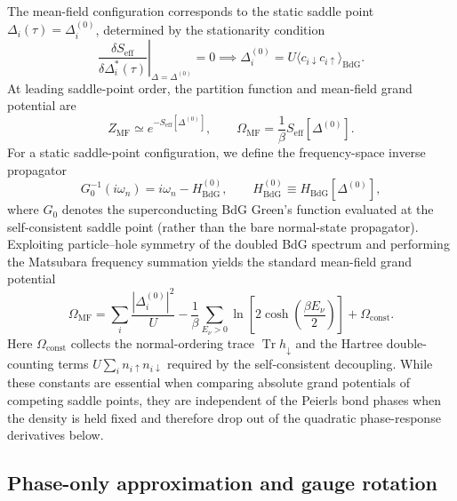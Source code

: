 \documentclass[aps,prb,twocolumn,superscriptaddress,floatfix]{revtex4-2}
\newcommand{\Tr}{\operatorname{Tr}}
\begin{document}
The mean-field configuration corresponds to the static saddle point $\Delta_i(\tau) = \Delta_i^{(0)}$, determined by the stationarity condition
\begin{equation}
\left.\frac{\delta S_{\mathrm{eff}}}{\delta \Delta_i^*(\tau)}\right|_{\Delta=\Delta^{(0)}} = 0 \implies \Delta_i^{(0)} = U \langle c_{i\downarrow}c_{i\uparrow} \rangle_{\mathrm{BdG}}.
\label{eq:A11}
\end{equation}
At leading saddle-point order, the partition function and mean-field grand potential are
\begin{equation}
Z_{\mathrm{MF}} \simeq e^{-S_{\mathrm{eff}}[\Delta^{(0)}]}, \qquad \Omega_{\mathrm{MF}} = \frac{1}{\beta} S_{\mathrm{eff}}[\Delta^{(0)}].
\label{eq:A12}
\end{equation}
For a static saddle-point configuration, we define the frequency-space inverse propagator
\begin{equation}
G_0^{-1}(i\omega_n) = i\omega_n - H_{\mathrm{BdG}}^{(0)}, \qquad H_{\mathrm{BdG}}^{(0)} \equiv H_{\mathrm{BdG}}[\Delta^{(0)}],
\label{eq:A13}
\end{equation}
where $G_0$ denotes the superconducting BdG Green's function evaluated at the self-consistent saddle point (rather than the bare normal-state propagator). Exploiting particle--hole symmetry of the doubled BdG spectrum and performing the Matsubara frequency summation yields the standard mean-field grand potential
\begin{equation}
\Omega_{\mathrm{MF}} = \sum_i \frac{|\Delta_i^{(0)}|^2}{U} - \frac{1}{\beta}\sum_{E_\nu > 0} \ln\left[2\cosh\left(\frac{\beta E_\nu}{2}\right)\right] + \Omega_{\mathrm{const}}.
\label{eq:A14}
\end{equation}
Here $\Omega_{\mathrm{const}}$ collects the normal-ordering trace $\Tr h_\downarrow$ and the Hartree double-counting terms $U\sum_i n_{i\uparrow}n_{i\downarrow}$ required by the self-consistent decoupling. While these constants are essential when comparing absolute grand potentials of competing saddle points, they are independent of the Peierls bond phases when the density is held fixed and therefore drop out of the quadratic phase-response derivatives below.

\subsection{Phase-only approximation and gauge rotation}
\end{document}
